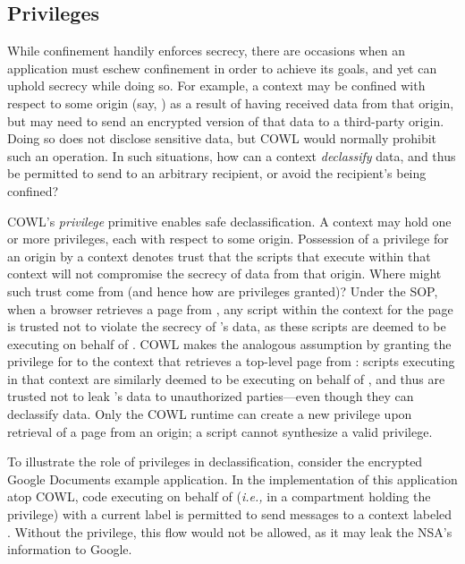\subsection{Privileges}
\label{sec:system:privileges}

While confinement handily enforces secrecy, there are occasions when
an application must eschew confinement in order to achieve its goals,
and yet can uphold secrecy while doing so. For example, a context may
be confined with respect to some origin (say, ) as a
result of having received data from that origin, but may need to send
an encrypted version of that data to a third-party origin. Doing so
does not disclose sensitive data, but COWL would normally prohibit
such an operation. In such situations, how can a context
\emph{declassify} data, and thus be permitted to send to an arbitrary
recipient, or avoid the recipient's being confined?

COWL's {\em privilege} primitive enables safe declassification. A
context may hold one or more privileges, each with respect to some
origin. Possession of a privilege for an origin by a context denotes
trust that the scripts that execute within that context will not
compromise the secrecy of data from that origin. Where might such
trust come from (and hence how are privileges granted)? Under the SOP,
when a browser retrieves a page from , any script within
the context for the page is trusted not to violate the secrecy of
's data, as these scripts are deemed to be executing on
behalf of . COWL makes the analogous assumption by
granting the privilege for  to the context that retrieves
a top-level page from : scripts executing in that context
are similarly deemed to be executing on behalf of , and
thus are trusted not to leak 's data to unauthorized
parties---even though they can declassify data. Only the COWL runtime
can create a new privilege upon retrieval of a page from an origin; a
script cannot synthesize a valid privilege.

To illustrate the role of privileges in declassification, consider the
encrypted Google Documents example application. In the implementation
of this application atop COWL, code executing on behalf of
 (\emph{i.e.,} in a compartment holding the 
privilege) with a current label  is permitted to send messages to a context
labeled .
%
Without the  privilege, this flow would not be allowed,
as it may leak the NSA's information to Google.
%


